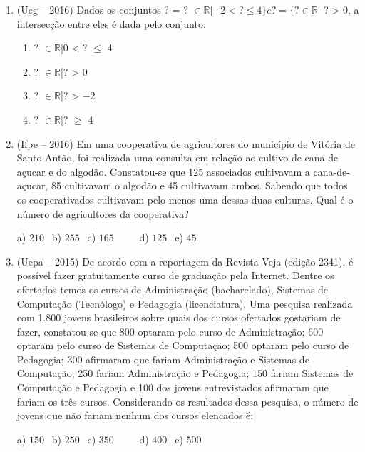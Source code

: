 \begin{multicols*}{2}
\begin{enumerate}
\begin{enumerate}
              \end{enumerate}

        \item (Ueg – 2016) Dados os conjuntos ? = {? $\in \mathbb{R}|-2 <  ?  \leq 4\} e ? = \{? \in \mathbb{R}|$ ? > 0}, a intersecção entre eles é dada pelo conjunto:

              \begin{enumerate}

                  \item {? $\in \mathbb{R}$|0 < ? $\leq$ 4}
                  \item {? $\in \mathbb{R}$|? > 0}
                  \item {? $\in \mathbb{R}$|? > $ -2 $}
                  \item {? $\in \mathbb{R}$|? $\geq$ 4}

              \end{enumerate}

        \item (Ifpe – 2016) Em uma cooperativa de agricultores do município de Vitória de Santo Antão, foi realizada uma consulta em relação ao cultivo de cana-de-açucar e do algodão. Constatou-se que 125 associados cultivavam a cana-de-açucar, 85 cultivavam o algodão e 45 cultivavam ambos. Sabendo que todos os cooperativados cultivavam pelo menos uma dessas duas culturas. Qual é o número de agricultores da cooperativa?

              a) $210 \ \ $ b) $255 \ \ $ c) $165 \ \ \ \ \ \ \ \ \ \ $ d) $125 \ \ $ e) $45 \ \ $

        \item (Uepa – 2015) De acordo com a reportagem da Revista Veja (edição 2341), é possível fazer gratuitamente curso de graduação pela Internet. Dentre os ofertados temos os cursos de Administração (bacharelado), Sistemas de Computação (Tecnólogo) e Pedagogia (licenciatura). Uma pesquisa realizada com 1.800 jovens brasileiros sobre quais dos cursos ofertados gostariam de fazer, constatou-se que 800 optaram pelo curso de Administração; 600 optaram pelo curso de Sistemas de Computação; 500 optaram pelo curso de Pedagogia; 300 afirmaram que fariam Administração e Sistemas de Computação; 250 fariam Administração e Pedagogia; 150 fariam Sistemas de Computação e Pedagogia e 100 dos jovens entrevistados afirmaram que fariam os três cursos. Considerando os resultados dessa pesquisa, o número de jovens que não fariam nenhum dos cursos elencados é:

              a) $150 \ \ $ b) $250 \ \ $ c) $350 \ \ \ \ \ \ \ \ \ \ $ d) $400 \ \ $ e) $500 \ \ $


\end{enumerate}
\end{multicols*}
